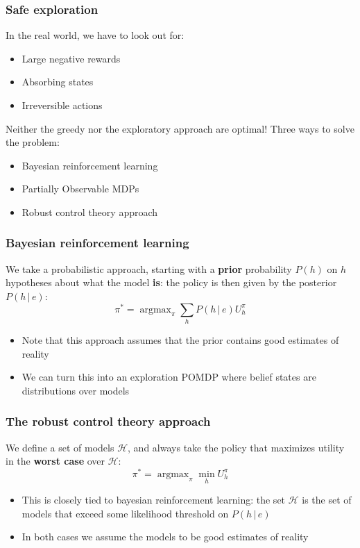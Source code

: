 \documentclass{beamer}
\DeclareMathOperator*{\argmax}{argmax}
\begin{document}
\begin{frame}
	\frametitle{Safe exploration}
	In the real world, we have to look out for:
	\begin{itemize}
		\item Large negative rewards
		\item Absorbing states 
		\item Irreversible actions 
	\end{itemize}
	Neither the greedy nor the exploratory approach are optimal!
	\pause
	Three ways to solve the problem:
	\begin{itemize}
		\item Bayesian reinforcement learning
		\item Partially Observable MDPs
		\item Robust control theory approach
	\end{itemize}
\end{frame}

\begin{frame}
	\frametitle{Bayesian reinforcement learning}
	We take a probabilistic approach, starting with a \textbf{prior} probability $P(h)$ on $h$ hypotheses about what the model \textbf{is}: the policy is then given by the posterior $P(h \, | \, e)$:
	$$
		\pi^* = \argmax_\pi \sum_h P(h \, | \, e) U_h^\pi
	$$
	\pause
	\begin{itemize}
		\item Note that this approach assumes that the prior contains good estimates of reality
		\item We can turn this into an exploration POMDP where belief states are distributions over models
	\end{itemize}
\end{frame}

\begin{frame}
	\frametitle{The robust control theory approach}
	We define a set of models $\mathcal{H}$, and always take the policy that maximizes utility in the \textbf{worst case} over $\mathcal{H}$:
	$$
		\pi^* = \argmax_\pi \min_h U_h^\pi
	$$
	\pause
	\begin{itemize}
		\item This is closely tied to bayesian reinforcement learning: the set $\mathcal{H}$ is the set of models that exceed some likelihood threshold on $P(h \, | \, e)$
		\item In both cases we assume the models to be good estimates of reality
	\end{itemize}
\end{frame}
\end{document}
